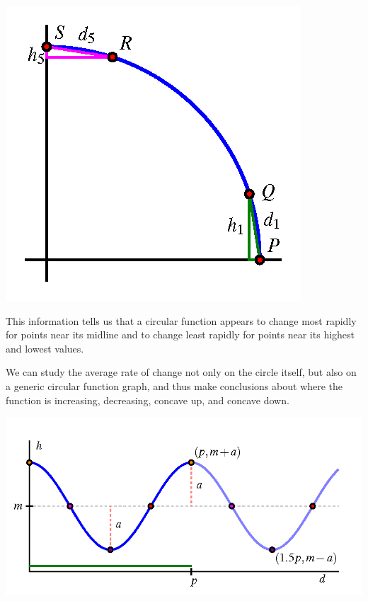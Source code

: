\documentclass[nooutcomes, noauthor]{ximera}
\begin{document}
\begin{image}
\includegraphics{traversing-circular-aroc-circle-20th.png}
\end{image}


This information tells us that a circular function appears to change most rapidly for points near its midline and to change least rapidly for points near its highest and lowest values.%

We can study the average rate of change not only on the circle itself, but also on a generic circular function graph, and thus make conclusions about where the function is increasing, decreasing, concave up, and concave down.%

\begin{image}
\includegraphics{traversing-circular-properties-graph.png}
\end{image}
\end{document}
